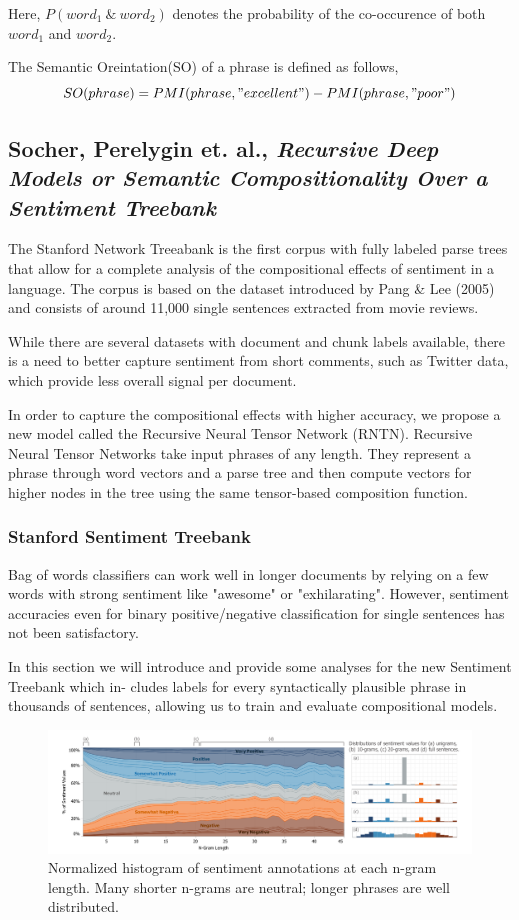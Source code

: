 \documentclass{llncs}
\begin{document}
Here, $P(word_1 \ \& \ word_2)$ denotes the probability of the co-occurence of both $word_1$ and $word_2$.

The Semantic Oreintation(SO) of a phrase is defined as follows,
$$
SO(phrase) = PMI(phrase, "excellent") - PMI(phrase, "poor")
$$

\subsection{Socher, Perelygin et. al., \emph{Recursive Deep Models or Semantic Compositionality Over a Sentiment Treebank}}

The Stanford Network Treeabank is the first corpus with fully labeled parse trees that allow for a complete analysis of the compositional effects of sentiment in a language. The corpus is based on the dataset introduced by Pang \& Lee (2005) and consists of around 11,000 single sentences extracted from movie reviews.

While there are several datasets with document and chunk labels
available, there is a need to better capture sentiment from short comments, such as Twitter data, which provide less overall signal per document.

In order to capture the compositional effects with higher accuracy, we propose a new model called the Recursive Neural Tensor Network (RNTN). Recursive Neural Tensor Networks take input phrases of any length. They represent a phrase through word vectors and a parse tree and then compute vectors for higher nodes in the tree using the same tensor-based composition function. 

\subsubsection{Stanford Sentiment Treebank}
Bag of words classifiers can work well in longer documents by relying on a few words with strong sentiment like "awesome" or "exhilarating". However, sentiment accuracies even for binary positive/negative classification for single sentences has not been satisfactory.

In this section we will introduce and provide some
analyses for the new Sentiment Treebank which in-
cludes labels for every syntactically plausible phrase
in thousands of sentences, allowing us to train and
evaluate compositional models.

\begin{figure}[H]
\caption{Normalized histogram of sentiment annotations at each n-gram length. Many shorter n-grams are neutral;
longer phrases are well distributed.}
\includegraphics[width=\textwidth]{cropped.png}
\end{figure}
\end{document}
